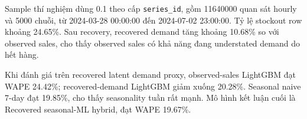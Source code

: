 Sample thí nghiệm dùng 0.1 theo cấp \texttt{series\_id}, gồm 11640000 quan sát hourly và 5000 chuỗi, từ 2024-03-28 00:00:00 đến 2024-07-02 23:00:00. Tỷ lệ stockout row khoảng 24.65\%. Sau recovery, recovered demand tăng khoảng 10.68\% so với observed sales, cho thấy observed sales có khả năng đang understated demand do hết hàng.

Khi đánh giá trên recovered latent demand proxy, observed-sales LightGBM đạt WAPE 24.42\%; recovered-demand LightGBM giảm xuống 20.28\%. Seasonal naive 7-day đạt 19.85\%, cho thấy seasonality tuần rất mạnh. Mô hình kết luận cuối là Recovered seasonal-ML hybrid, đạt WAPE 19.67\%.
